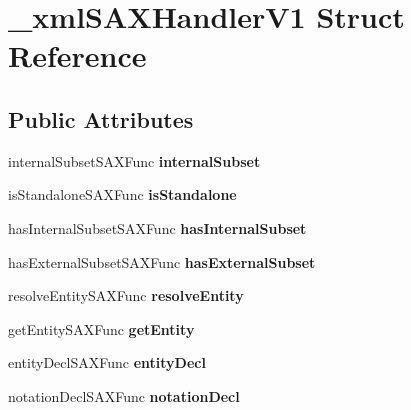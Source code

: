 \hypertarget{struct__xmlSAXHandlerV1}{
\section{\_\-xmlSAXHandlerV1 Struct Reference}
\label{struct__xmlSAXHandlerV1}
}
\subsection*{Public Attributes}
\begin{DoxyCompactItemize}
\item 
\hypertarget{struct__xmlSAXHandlerV1_a42f4e20c793c236300b6101d49212580}{
internalSubsetSAXFunc {\bfseries internalSubset}}
\label{struct__xmlSAXHandlerV1_a42f4e20c793c236300b6101d49212580}

\item 
\hypertarget{struct__xmlSAXHandlerV1_a4b9bd1931ab440bd5b7d9df8009440bc}{
isStandaloneSAXFunc {\bfseries isStandalone}}
\label{struct__xmlSAXHandlerV1_a4b9bd1931ab440bd5b7d9df8009440bc}

\item 
\hypertarget{struct__xmlSAXHandlerV1_afe7c41e644a1152afd4bc13fe56a60de}{
hasInternalSubsetSAXFunc {\bfseries hasInternalSubset}}
\label{struct__xmlSAXHandlerV1_afe7c41e644a1152afd4bc13fe56a60de}

\item 
\hypertarget{struct__xmlSAXHandlerV1_a0ca8a76baf0d76b04d914ad9a56c4506}{
hasExternalSubsetSAXFunc {\bfseries hasExternalSubset}}
\label{struct__xmlSAXHandlerV1_a0ca8a76baf0d76b04d914ad9a56c4506}

\item 
\hypertarget{struct__xmlSAXHandlerV1_a949a9307787020339ed0d46376a676ea}{
resolveEntitySAXFunc {\bfseries resolveEntity}}
\label{struct__xmlSAXHandlerV1_a949a9307787020339ed0d46376a676ea}

\item 
\hypertarget{struct__xmlSAXHandlerV1_a6d00cd90884aff134c70cfed77798cdb}{
getEntitySAXFunc {\bfseries getEntity}}
\label{struct__xmlSAXHandlerV1_a6d00cd90884aff134c70cfed77798cdb}

\item 
\hypertarget{struct__xmlSAXHandlerV1_ab8767df981b572d1a4bb72de4eece794}{
entityDeclSAXFunc {\bfseries entityDecl}}
\label{struct__xmlSAXHandlerV1_ab8767df981b572d1a4bb72de4eece794}

\item 
\hypertarget{struct__xmlSAXHandlerV1_a46b3e77687757223f11de89d19290e78}{
notationDeclSAXFunc {\bfseries notationDecl}}
\label{struct__xmlSAXHandlerV1_a46b3e77687757223f11de89d19290e78}


\end{DoxyCompactItemize}

